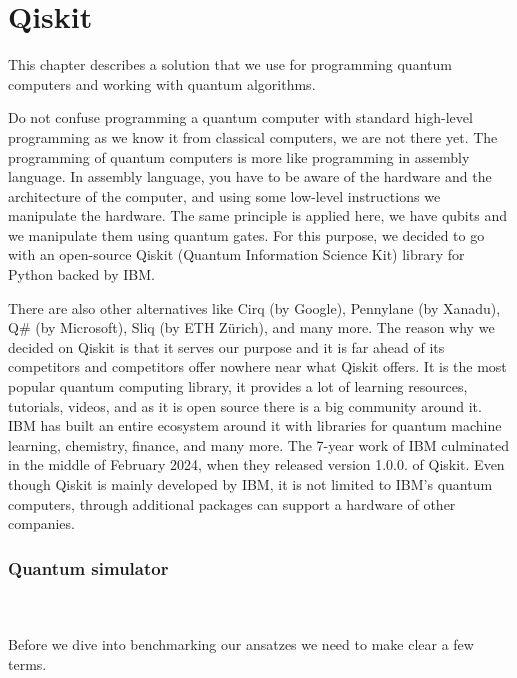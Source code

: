 \chapter{Qiskit}\label{ch:qiskit}
This chapter describes a solution that we use for programming quantum computers and working with quantum algorithms. 

Do not confuse programming a quantum computer with standard high-level programming as we know it from classical computers, we are not there yet. The programming of quantum computers is more like programming in assembly language. In assembly language, you have to be aware of the hardware and the architecture of the computer, and using some low-level instructions we manipulate the hardware. The same principle is applied here, we have qubits and we manipulate them using quantum gates. For this purpose, we decided to go with an open-source Qiskit (Quantum Information Science Kit) library for Python backed by IBM.

There are also other alternatives like Cirq (by Google), Pennylane (by Xanadu), Q\# (by Microsoft), Sliq (by ETH Zürich), and many more.  The reason why we decided on Qiskit is that it serves our purpose and it is far ahead of its competitors and competitors offer nowhere near what Qiskit offers. It is the most popular quantum computing library, it provides a lot of learning resources, tutorials, videos, and as it is open source there is a big community around it. IBM has built an entire ecosystem around it \cite{qiskit_ecosystem} with libraries for quantum machine learning, chemistry, finance, and many more. The 7-year work of IBM culminated in the middle of February 2024, when they released version 1.0.0. of Qiskit. Even though Qiskit is mainly developed by IBM, it is not limited to IBM's quantum computers, through additional packages can support a hardware of other companies.

\subsection{Quantum simulator}



\\
\\
Before we dive into benchmarking our ansatzes we need to make clear a few terms.

